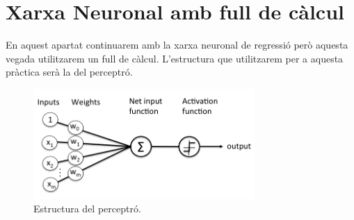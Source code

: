 %
%
%
%

\section{Xarxa Neuronal amb full de càlcul}\label{sec:11}
En aquest apartat continuarem amb la xarxa neuronal de regressió però aquesta vegada utilitzarem un full de càlcul.
L'estructura que utilitzarem per a aquesta pràctica serà la del perceptró.

\begin{figure}[h!]
    \centering
    \includegraphics[width=0.75\textwidth]{./figures/perceptro.png}
    \caption{Estructura del perceptró.~\cite{Img_perceptro}}
\end{figure}

